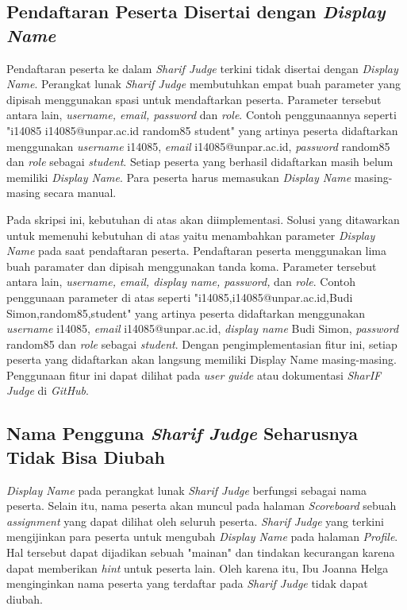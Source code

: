 \subsection{Pendaftaran Peserta Disertai dengan \textit{Display Name}}
Pendaftaran peserta ke dalam \textit{Sharif Judge} terkini tidak disertai dengan \textit{Display Name}. Perangkat lunak \textit{Sharif Judge} membutuhkan empat buah parameter yang dipisah menggunakan spasi untuk mendaftarkan peserta. Parameter tersebut antara lain, \textit{username, \textit{email}, password} dan \textit{role}. Contoh penggunaannya seperti "i14085 i14085@unpar.ac.id random85 student" yang artinya peserta didaftarkan menggunakan \textit{username} i14085, \textit{email} i14085@unpar.ac.id, \textit{password} random85 dan \textit{role} sebagai \textit{student}. Setiap peserta yang berhasil didaftarkan masih belum memiliki \textit{Display Name}. Para peserta harus memasukan \textit{Display Name} masing-masing secara manual. 

Pada skripsi ini, kebutuhan di atas akan diimplementasi. Solusi yang ditawarkan untuk memenuhi kebutuhan di atas yaitu menambahkan parameter \textit{Display Name} pada saat pendaftaran peserta. Pendaftaran peserta menggunakan lima buah paramater dan dipisah menggunakan tanda koma. Parameter tersebut antara lain,\textit{ username, email, display name, password,} dan \textit{role}. Contoh penggunaan parameter di atas seperti "i14085,i14085@unpar.ac.id,Budi Simon,random85,student" yang artinya peserta didaftarkan menggunakan \textit{username} i14085, \textit{email} i14085@unpar.ac.id, \textit{display name} Budi Simon, \textit{password} random85 dan \textit{role} sebagai \textit{student}. Dengan pengimplementasian fitur ini, setiap peserta yang didaftarkan akan langsung memiliki Display Name masing-masing. Penggunaan fitur ini dapat dilihat pada \textit{user guide} atau dokumentasi \textit{SharIF Judge} di \textit{GitHub}.

\subsection{Nama Pengguna \textit{Sharif Judge} Seharusnya Tidak Bisa Diubah}
\textit{Display Name} pada perangkat lunak \textit{Sharif Judge} berfungsi sebagai nama peserta. Selain itu, nama peserta akan muncul pada halaman \textit{Scoreboard} sebuah \textit{assignment} yang dapat dilihat oleh seluruh peserta. \textit{Sharif Judge} yang terkini mengijinkan para peserta untuk mengubah \textit{Display Name} pada halaman \textit{Profile}. Hal tersebut dapat dijadikan sebuah "mainan" dan tindakan kecurangan karena dapat memberikan \textit{hint} untuk peserta lain. Oleh karena itu, Ibu Joanna Helga menginginkan nama peserta yang terdaftar pada \textit{Sharif Judge} tidak dapat diubah. 

